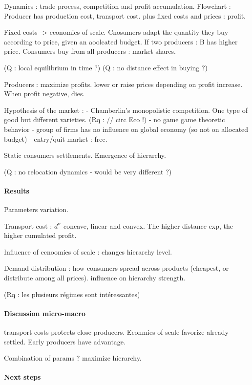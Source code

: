 Dynamics : trade process, competition and profit accumulation. Flowchart : Producer has production cost, transport cost. plus fixed costs and prices : profit.

Fixed costs -> economies of scale. Cnosumers adapt the quantity they buy according to price, given an aoolcated budget. If two producers : B has higher price. Consumers buy from all producers : market shares.

(Q : local equilibrium in time ?)
(Q : no distance effect in buying ?)

Producers : maximize profits. lower or raise prices depending on profit increase. When profit negative, dies.

Hypothesis of the market : 
- Chamberlin's monopolistic competition. One type of good but different varieties. (Rq : // circ Eco !)
- no game game theoretic behavior
- group of firms has no influence on global economy (so not on allocated budget)
- entry/quit market : free.

Static consumers settlements. Emergence of hierarchy.

(Q : no relocation dynamics - would be very different ?)


\paragraph{Results} 

Parameters variation.

Transport cost : $d^{\alpha}$ concave, linear and convex. The higher distance exp, the higher cumulated profit.

Influence of ecnoomies of scale : changes hierarchy level.

Demand distribution : how consumers spread across products (cheapest, or distribute among all prices).
influence on hierarchy strength. 

(Rq : les plusieurs régimes sont intéressantes)

\paragraph{Discussion micro-macro}

transport costs protects close producers.
Econmies of scale favorize already settled.
Early producers have advantage.


Combination of params ? maximize hierarchy.


\paragraph{Next steps}

